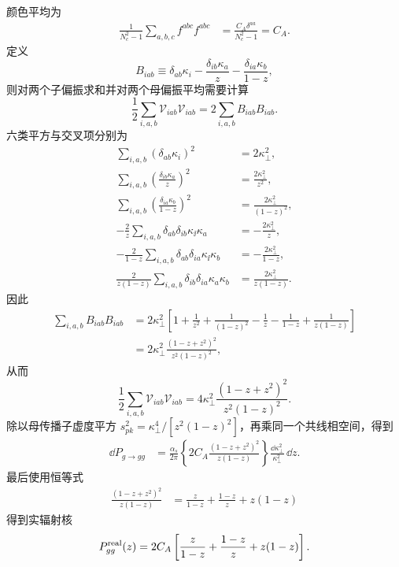 \begin{derivation}
颜色平均为
\begin{align*}
 \frac1{N_c^2-1}\sum_{a,b,c}f^{abc}f^{abc}
 &=\frac{C_A\delta^{aa}}{N_c^2-1}
 =C_A.
\end{align*}
定义
\begin{equation*}
 B_{iab}
 \equiv
 \delta_{ab}\kappa_i
 -\frac{\delta_{ib}\kappa_a}{z}
 -\frac{\delta_{ia}\kappa_b}{1-z},
\end{equation*}
则对两个子偏振求和并对两个母偏振平均需要计算
\begin{equation*}
 \frac12\sum_{i,a,b}\mathcal V_{iab}\mathcal V_{iab}
 =2\sum_{i,a,b}B_{iab}B_{iab}.
\end{equation*}
六类平方与交叉项分别为
\begin{align*}
 \sum_{i,a,b}(\delta_{ab}\kappa_i)^2
 &=2\kappa_\perp^2,\\
 \sum_{i,a,b}\left(\frac{\delta_{ib}\kappa_a}{z}\right)^2
 &=\frac{2\kappa_\perp^2}{z^2},\\
 \sum_{i,a,b}\left(\frac{\delta_{ia}\kappa_b}{1-z}\right)^2
 &=\frac{2\kappa_\perp^2}{(1-z)^2},\\
 -\frac{2}{z}
 \sum_{i,a,b}\delta_{ab}\delta_{ib}\kappa_\ii\kappa_a
 &=-\frac{2\kappa_\perp^2}{z},\\
 -\frac{2}{1-z}
 \sum_{i,a,b}\delta_{ab}\delta_{ia}\kappa_\ii\kappa_b
 &=-\frac{2\kappa_\perp^2}{1-z},\\
 \frac{2}{z(1-z)}
 \sum_{i,a,b}\delta_{ib}\delta_{ia}\kappa_a\kappa_b
 &=\frac{2\kappa_\perp^2}{z(1-z)}.
\end{align*}
因此
\begin{align*}
 \sum_{i,a,b}B_{iab}B_{iab}
 &=2\kappa_\perp^2
 \left[
 1+\frac1{z^2}+\frac1{(1-z)^2}
 -\frac1z-\frac1{1-z}+\frac1{z(1-z)}
 \right]\\
 &=2\kappa_\perp^2
 \frac{(1-z+z^2)^2}{z^2(1-z)^2},
\end{align*}
从而
\begin{equation*}
 \frac12\sum_{i,a,b}\mathcal V_{iab}\mathcal V_{iab}
 =4\kappa_\perp^2
 \frac{(1-z+z^2)^2}{z^2(1-z)^2}.
\end{equation*}
除以母传播子虚度平方 $s_{pk}^2=\kappa_\perp^4/[z^2(1-z)^2]$，再乘同一个共线相空间，得到
\begin{align*}
 \dd P_{g\to gg}
 &=\frac{\alpha_s}{2\pi}
 \left\{2C_A
 \frac{(1-z+z^2)^2}{z(1-z)}\right\}
 \frac{\dd\kappa_\perp^2}{\kappa_\perp^2}\,\dd z.
\end{align*}
最后使用恒等式
\begin{align*}
 \frac{(1-z+z^2)^2}{z(1-z)}
 &=\frac{z}{1-z}+\frac{1-z}{z}+z(1-z)
\end{align*}
得到实辐射核
\begin{equation*}
 P_{gg}^{\rm real}(z)
 =2C_A\left[
 \frac{z}{1-z}+\frac{1-z}{z}+z(1-z)
 \right].
\end{equation*}


\end{derivation}
